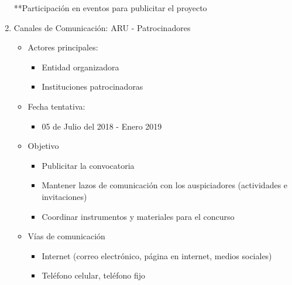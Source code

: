 \documentclass{article}
\begin{document}
\begin{enumerate}
**Participación en eventos para publicitar el proyecto

\item Canales de Comunicación: ARU - Patrocinadores
\begin{itemize}
\item Actores principales:
\begin{itemize}
\item Entidad organizadora
\item Instituciones patrocinadoras
\end{itemize}
\item Fecha tentativa:
\begin{itemize}
\item 05 de Julio del 2018 - Enero 2019
\end{itemize}
\item Objetivo
\begin{itemize}
\item Publicitar la convocatoria
\item Mantener lazos de comunicación con los auspiciadores (actividades e invitaciones)
\item Coordinar instrumentos y materiales para el concurso
\end{itemize}
\item Vías de comunicación
\begin{itemize}
\item Internet (correo electrónico, página en internet, medios sociales)
\item Teléfono celular, teléfono fijo
\end{itemize}
\end{itemize}


\end{enumerate}
\end{document}
